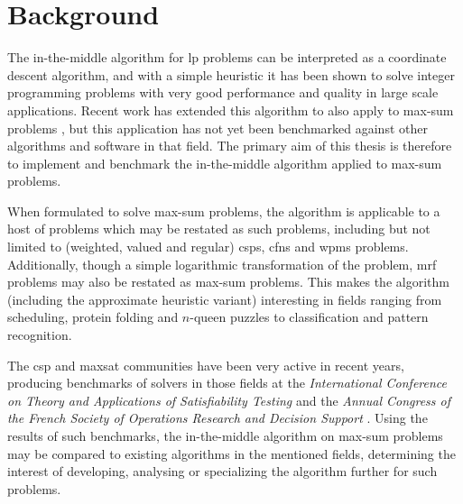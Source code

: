 \section{Background}
The in-the-middle algorithm \parencite{Wedelin95} for \gls{lp} problems can be interpreted as a coordinate descent algorithm, and with a simple heuristic it has been shown to solve integer programming problems with very good performance and quality in large scale applications.
Recent work has extended this algorithm to also apply to max-sum problems \parencites{Wedelin08}{Wedelin13}, but this application has not yet been benchmarked against other algorithms and software in that field.
The primary aim of this thesis is therefore to implement and benchmark the in-the-middle algorithm applied to max-sum problems.

When formulated to solve max-sum problems, the algorithm is applicable to a host of problems which may be restated as such problems, including but not limited to (weighted, valued and regular) \glspl{csp}, \glspl{cfn} and \gls{wpms} problems.
Additionally, though a simple logarithmic transformation of the problem, \gls{mrf} problems may also be restated as max-sum problems.
This makes the algorithm (including the approximate heuristic variant) interesting in fields ranging from scheduling, protein folding and \(n\)-queen puzzles to classification and pattern recognition.

The \gls{csp} and \gls{maxsat} communities have been very active in recent years, producing benchmarks of solvers in those fields at the \emph{International Conference on Theory and Applications of Satisfiability Testing} \parencite{Argelich11} and the \emph{Annual Congress of the French Society of Operations Research and Decision Support} \parencite{Allouche14b}.
Using the results of such benchmarks, the in-the-middle algorithm on max-sum problems may be compared to existing algorithms in the mentioned fields, determining the interest of developing, analysing or specializing the algorithm further for such problems.

